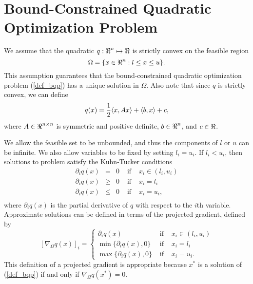 \section{Bound-Constrained Quadratic Optimization Problem}

\label{qp}

We assume that the quadratic $q : \mbox{${\Re}$}^n \mapsto \mbox{${\Re}$} $ is strictly convex
on the feasible region
\begin{equation} \label{def_bounds}
\Omega = \{ x \in \mbox{${\Re}$}^n: l \leq x \leq u \} .
\end{equation}
This assumption guarantees that the bound-constrained 
quadratic optimization problem (\ref{def_bqp}) has a unique solution
in  $\Omega$.
Also note that since $q$ is strictly convex, we can define
\begin{equation} \label{def-quadratic}
q(x) = \frac{1}{2} \langle x , {A} x \rangle + \langle b , x \rangle + c,
\end{equation}
where $A \in \mbox{${\Re}$}^{n \times n}$ is symmetric and
positive definite, $ b \in \mbox{${\Re}$}^n$, and $c \in \mbox{${\Re}$}$.

We allow the feasible set  to be unbounded,
and thus the components of $l$ or $u$ can be infinite.
We also allow variables to be fixed by setting $ l_i = u_i $.
If $ l_i < u_i $, then  solutions to problem  
satisfy the Kuhn-Tucker conditions
\[ \begin{array}{lllll}
\partial_iq(x) & = & 0 & \mbox{ if } & x_i \in (l_i, u_i) \\
\partial_iq(x) & \geq & 0 & \mbox{ if } & x_i = l_i \\
\partial_iq(x) & \leq & 0 & \mbox{ if } & x_i = u_i , \\
\end{array}
\]
where $\partial_iq(x)$ is the partial derivative of $q$ with
respect to the $i$th variable.
Approximate solutions can be defined in terms of the projected
gradient, defined by
\begin{equation} \label{proj-gradient}
 \left[ \nabla _{\Omega} q(x) \right] _i = \left\{
\begin{array}{lll}
\partial_i q(x) & \mbox{ if } & x_i \in (l_i, u_i) \\
\min \{ \partial_i q(x),0 \} & \mbox{ if } & x_i = l_i \\
\max \{ \partial_i q(x),0 \} & \mbox{ if } & x_i = u_i .
\end{array}
\right.
\end{equation}
This definition of a projected gradient is appropriate 
because $x^*$ is a solution of (\ref{def_bqp}) if and only if
$\nabla_{\Omega} q(x^*)=0$.

